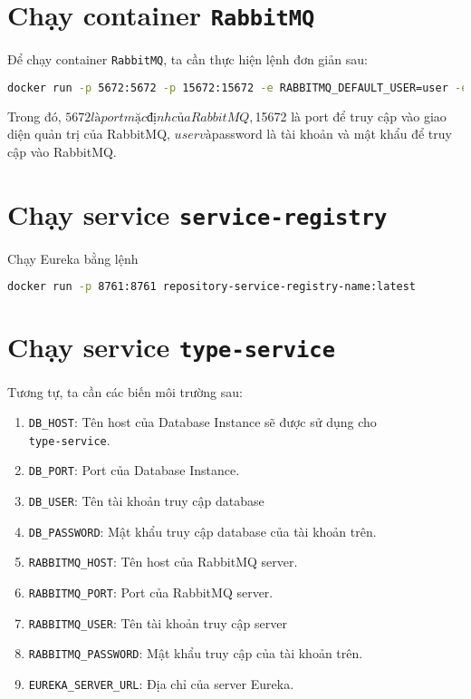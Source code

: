 \section{Chạy container \texttt{RabbitMQ}}
Để chạy container \texttt{RabbitMQ}, ta cần thực hiện lệnh đơn giản sau: 
\begin{lstlisting}[language=bash]
    docker run -p 5672:5672 -p 15672:15672 -e RABBITMQ_DEFAULT_USER=user -e RABBITMQ_DEFAULT_PASS=password rabbitmq:3-management
\end{lstlisting}
Trong đó, ${5672} là port mặc định của RabbitMQ, ${15672} là port để truy cập vào giao diện quản trị của RabbitMQ, ${user} và ${password} là tài khoản và mật khẩu để truy cập vào RabbitMQ.

\section{Chạy service \texttt{service-registry}}
Chạy Eureka bằng lệnh

\begin{lstlisting}[language=bash]
    docker run -p 8761:8761 repository-service-registry-name:latest
\end{lstlisting}


\section{Chạy service \texttt{type-service}}
Tương tự, ta cần các biến môi trường sau:
\begin{enumerate}
    \item \texttt{DB\_HOST}: Tên host của Database Instance sẽ được sử dụng cho \\
    \texttt{type-service}.
    \item \texttt{DB\_PORT}: Port của Database Instance.
    \item \texttt{DB\_USER}: Tên tài khoản truy cập database
    \item \texttt{DB\_PASSWORD}: Mật khẩu truy cập database của tài khoản trên.
    \item \texttt{RABBITMQ\_HOST}: Tên host của RabbitMQ server.
    \item \texttt{RABBITMQ\_PORT}: Port của RabbitMQ server.
    \item \texttt{RABBITMQ\_USER}: Tên tài khoản truy cập server
    \item \texttt{RABBITMQ\_PASSWORD}: Mật khẩu truy cập của tài khoản trên.
    \item \texttt{EUREKA\_SERVER\_URL}: Địa chỉ của server Eureka.
\end{enumerate}

